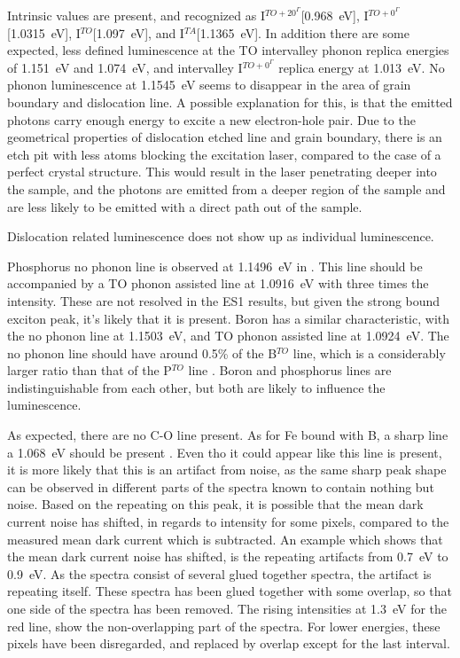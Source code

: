 Intrinsic values are present, and recognized as I$^{TO+20^\Gamma}$[0.968~eV], I$^{TO+0^\Gamma}$[1.0315~eV], I$^{TO}$[1.097~eV], and I$^{TA}$[1.1365~eV]. In addition there are some expected, less defined luminescence at the TO intervalley phonon replica energies of 1.151~eV and 1.074~eV, and intervalley I$^{TO+0^\Gamma}$ replica energy at 1.013~eV. No phonon luminescence at 1.1545~eV seems to disappear in the area of grain boundary and dislocation line. A possible explanation for this, is that the emitted photons carry enough energy to excite a new electron-hole pair. Due to the geometrical properties of dislocation etched line and grain boundary, there is an etch pit with less atoms blocking the excitation laser, compared to the case of a perfect crystal structure. This would result in the laser penetrating deeper into the sample, and the photons are emitted from a deeper region of the sample and are less likely to be emitted with a direct path out of the sample.

Dislocation related luminescence does not show up as individual luminescence. 

Phosphorus no phonon line is observed at 1.1496~eV in \cite{dean67}. This line should be accompanied by a TO phonon assisted line at 1.0916~eV with three times the intensity. These are not resolved in the ES1 results, but given the strong bound exciton peak, it's likely that it is present. Boron has a similar characteristic, with the no phonon line at 1.1503~eV, and TO phonon assisted line at 1.0924~eV. The no phonon line should have around 0.5\% of the B$^{TO}$ line, which is a considerably larger ratio than that of the P$^{TO}$ line \cite{dean67}. Boron and phosphorus lines are indistinguishable from each other, but both are likely to influence the luminescence. 


As expected, there are no C-O line present. As for Fe bound with B, a sharp line a 1.068~eV should be present \cite{mohring83}. Even tho it could appear like this line is present, it is more likely that this is an artifact from noise, as the same sharp peak shape can be observed in different parts of the spectra known to contain nothing but noise. Based on the repeating on this peak, it is possible that the mean dark current noise has shifted, in regards to intensity for some pixels, compared to the measured mean dark current which is subtracted. An example which shows that the mean dark current noise has shifted, is the repeating artifacts from 0.7~eV to 0.9~eV. As the spectra consist of several glued together spectra, the artifact is repeating itself. These spectra has been glued together with some overlap, so that one side of the spectra has been removed. The rising intensities at 1.3~eV for the red line, show the non-overlapping part of the spectra. For lower energies, these pixels have been disregarded, and replaced by overlap except for the last interval.








